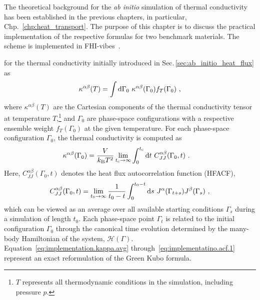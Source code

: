 \label{chp:implementation}

The theoretical background for the \emph{ab initio} simulation of thermal conductivity has been established in the previous chapters, in particular, Chp.~\ref{chp:heat_transport}. The purpose of this chapter is to discuss the practical implementation of the respective formulas for two benchmark materials. The scheme is implemented in FHI-vibes~\cite{FHI-vibes}.

 for the thermal conductivity initially introduced in Sec.\,\ref{sec:ab_initio_heat_flux} as
\begin{align}
	\kappa^{\alpha \beta} (T)
		= \int \d \Gamma_0 ~ \kappa^{\alpha \beta} (\Gamma_0) f_T (\Gamma_0) ~,
	\label{eq:implementation.kappa.avg}
\end{align}
where $\kappa^{\alpha \beta} (T)$ are the Cartesian components of the thermal conductivity tensor at temperature $T$,\footnote{$T$ represents all thermodynamic conditions in the simulation, including pressure $p$.} and $\Gamma_0$ are phase-space configurations with a respective ensemble weight $f_T (\Gamma_0)$ at the given temperature. For each phase-space configuration $\Gamma_0$, the thermal conductivity is computed as
\begin{align}
	\kappa^{\alpha \beta} (\Gamma_0)
		&=
		\frac{V}{k_{\rm B} T^2} 
		\lim_{t_{\rm c} \to \infty}
		\int_{0}^{\tcut} 
		\d t ~ C_{JJ}^{\alpha \beta} (\Gamma_0, t)~.
	\label{eq:implementatino.kappa.1}
\end{align}
Here, $	C^{\alpha \beta}_{J J} (\Gamma_0, t)$ denotes the heat flux autocorrelation function (HFACF),
\begin{align}
	C^{\alpha \beta}_{J J} (\Gamma_0, t)
		=
		\lim_{t_{0} \to \infty}
		\frac{1}{t_0 - t}
		\int_{0}^{t_{\rm 0} - t} 
		\d s ~ J^\alpha (\Gamma_{t + s}) J^\beta (\Gamma_s)~,
	\label{eq:implementatino.acf.1}
\end{align}
which can be viewed as an average over all available starting conditions $\Gamma_s$ during a simulation of length $t_0$. Each phase-space point $\Gamma_t$ is related to the initial configuration $\Gamma_0$ through the canonical time evolution determined by the many-body Hamiltonian of the system, $\mathcal H (\Gamma)$. Equation~\eqref{eq:implementation.kappa.avg} through~\eqref{eq:implementatino.acf.1} represent an exact reformulation of the Green Kubo formula.


